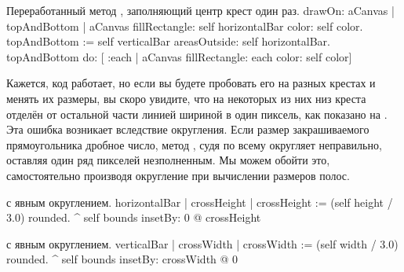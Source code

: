 \documentclass[a4paper,10pt,twoside]{book}
\begin{document}
\begin{method}{Переработанный метод , заполняющий центр крест один раз.}
drawOn: aCanvas 
	| topAndBottom |
	aCanvas fillRectangle: self horizontalBar color: self color.
	topAndBottom := self verticalBar areasOutside: self horizontalBar. 
	topAndBottom do: [ :each | aCanvas fillRectangle: each color: self color]
\end{method}

Кажется, код работает, но если вы будете пробовать его на разных крестах и менять их размеры, вы скоро увидите, что на некоторых из них низ креста отделён от остальной части линией шириной в один пиксель, как показано на .
Эта ошибка возникает вследствие округления. Если размер закрашиваемого прямоугольника дробное число, метод , 
судя по всему округляет неправильно, оставляя один ряд пикселей незполненным.
Мы можем обойти это, самостоятельно производя округление при вычислении размеров полос.

\begin{method}{ с явным округлением.}
horizontalBar
	| crossHeight |
	crossHeight := (self height / 3.0) rounded.
	^ self bounds insetBy: 0 @ crossHeight
\end{method}

\begin{method}{ с явным округлением.}
verticalBar
	| crossWidth |
	crossWidth := (self width / 3.0) rounded.
	^ self bounds insetBy: crossWidth @ 0
\end{method}



\end{document}
